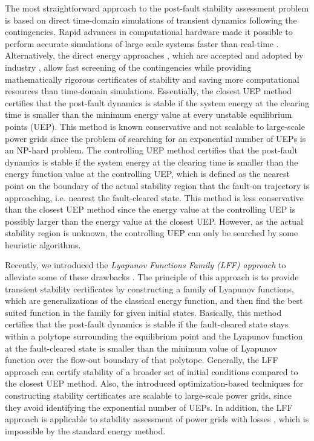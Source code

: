 \documentclass[final]{IEEEtran}
\begin{document}
The most straightforward approach to the post-fault
stability assessment problem is based on direct time-domain
simulations of transient dynamics following the contingencies.
Rapid advances in computational hardware made it possible to
perform accurate simulations of large scale systems faster than
real-time \cite{Huang:2012il,Nagel:2013kf}. Alternatively, the direct energy approaches \cite{Pai:1981dv,Chiang:1994cUEP,Chiang:2011eo}, which are accepted and adopted by industry \cite{Tong:2010},
allow fast screening of the
contingencies while providing mathematically rigorous
certificates of stability and saving more computational resources than time-domain simulations. Essentially, the closest UEP method \cite{Chiang:1994cUEP} certifies that the post-fault dynamics is stable
if the system energy at the clearing time is smaller than the minimum energy value at every unstable equilibrium points (UEP). This method is known
conservative and not scalable to large-scale power grids since the problem of searching for an exponential number of UEPs is an NP-hard problem. The controlling UEP method \cite{Zou:2003ji} certifies that the post-fault dynamics is stable
if the system energy at the clearing time is smaller than the energy function value at the controlling UEP, which is defined as the nearest point on the boundary of the actual stability region that the fault-on trajectory is approaching, i.e. nearest the fault-cleared state. This method is less conservative than the closest UEP method since the energy value at the controlling UEP is possibly larger than the energy value at the closest UEP. However, as the actual stability region is unknown, the controlling UEP can only be searched by some heuristic algorithms.  


Recently, we introduced the \emph{Lyapunov Functions Family (LFF) approach} to alleviate some of these drawbacks \cite{Vu:2014}.
The principle of this approach is to provide transient stability certificates
by constructing a family of Lyapunov functions, which are generalizations of the classical energy function,
and then find the best suited function
in the family for given initial states. Basically, this method certifies that the post-fault dynamics is stable
if the fault-cleared state stays within a polytope surrounding the equilibrium point and the Lyapunov function at the fault-cleared state is smaller than the minimum value of Lyapunov function over the flow-out boundary of that polytope. 
Generally, the LFF approach can certify stability of a
broader set of initial conditions compared to the closest UEP method.
Also, the introduced optimization-based techniques for constructing stability certificates are scalable to large-scale power grids,
since they avoid identifying the exponential number of UEPs. In addition, the LFF approach is applicable to stability assessment of 
power grids with losses \cite{Vu:2014acc}, which is impossible by the standard energy method.
\end{document}
